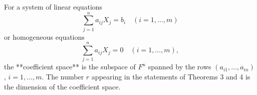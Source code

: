 For a system of linear equations
$$\sum_{j=1}^{n} a_{ij} X_j = b_i \quad (i = 1, \ldots, m)$$
or homogeneous equations
$$\sum_{j=1}^{n} a_{ij} X_j = 0 \quad (i = 1, \ldots, m),$$
the **coefficient space** is the subspace of $F^n$ spanned by the rows $(a_{i1}, \ldots, a_{in})$, $i = 1, \ldots, m$. The number $r$ appearing in the statements of Theorems 3 and 4 is the dimension of the coefficient space.
